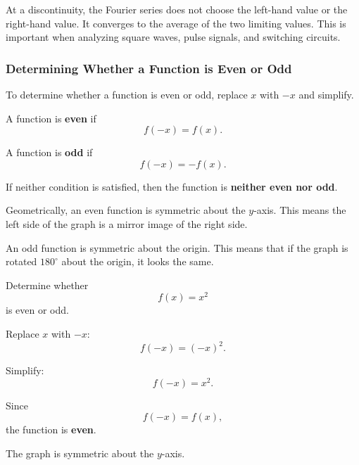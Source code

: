 \begin{noteBox}
    At a discontinuity, the Fourier series does not choose the left-hand value or the right-hand value. It converges to the average of the two limiting values. This is important when analyzing square waves, pulse signals, and switching circuits.
\end{noteBox}

\subsubsection*{Determining Whether a Function is Even or Odd}

\begin{conceptbox}
    To determine whether a function is even or odd, replace $x$ with $-x$ and simplify.

    A function is \textbf{even} if
    \[
        f(-x)=f(x).
    \]

    A function is \textbf{odd} if
    \[
        f(-x)=-f(x).
    \]

    If neither condition is satisfied, then the function is \textbf{neither even nor odd}.
\end{conceptbox}

Geometrically, an even function is symmetric about the $y$-axis. This means the left side of the graph is a mirror image of the right side.

An odd function is symmetric about the origin. This means that if the graph is rotated $180^\circ$ about the origin, it looks the same.

\begin{examplebox}
    Determine whether
    \[
        f(x)=x^2
    \]
    is even or odd.

    Replace $x$ with $-x$:
    \[
        f(-x)=(-x)^2.
    \]

    Simplify:
    \[
        f(-x)=x^2.
    \]

    Since
    \[
        f(-x)=f(x),
    \]
    the function is \textbf{even}.

    \begin{center}
    \end{center}
    The graph is symmetric about the $y$-axis.
\end{examplebox}


